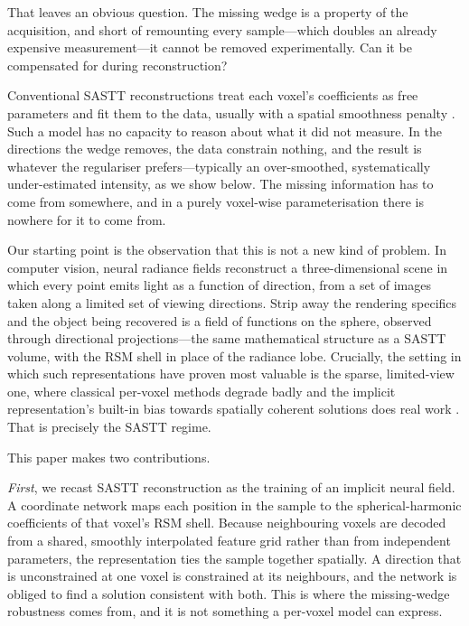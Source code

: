 \documentclass[11pt,a4paper]{article}
\begin{document}
That leaves an obvious question. The missing wedge is a property of the acquisition, and
short of remounting every sample---which doubles an already expensive measurement---it
cannot be removed experimentally. Can it be compensated for during reconstruction?

Conventional SASTT reconstructions treat each voxel's coefficients as free parameters and
fit them to the data, usually with a spatial smoothness penalty
\citep{Liebi2018,Nielsen2023}. Such a model has no capacity to reason about what it did not
measure. In the directions the wedge removes, the data constrain nothing, and the result is
whatever the regulariser prefers---typically an over-smoothed, systematically
under-estimated intensity, as we show below. The missing information has to come from
somewhere, and in a purely voxel-wise parameterisation there is nowhere for it to come
from.

Our starting point is the observation that this is not a new kind of problem. In computer
vision, neural radiance fields \citep{Mildenhall2020} reconstruct a three-dimensional
scene in which every point emits light as a function of direction, from a set of images
taken along a limited set of viewing directions. Strip away the rendering specifics and
the object being recovered is a field of functions on the sphere, observed through
directional projections---the same mathematical structure as a SASTT volume, with the RSM shell
in place of the radiance lobe. Crucially, the setting in which such representations have
proven most valuable is the sparse, limited-view one, where classical per-voxel methods
degrade badly and the implicit representation's built-in bias towards spatially coherent
solutions does real work \citep{Zha2022}. That is precisely the SASTT regime.

This paper makes two contributions.

\emph{First}, we recast SASTT reconstruction as the training of an implicit neural field.
A coordinate network maps each position in the sample to the spherical-harmonic
coefficients of that voxel's RSM shell. Because neighbouring voxels are decoded from a shared,
smoothly interpolated feature grid rather than from independent parameters, the
representation ties the sample together spatially. A direction that is unconstrained at
one voxel is constrained at its neighbours, and the network is obliged to find a solution
consistent with both. This is where the missing-wedge robustness comes from, and it is not
something a per-voxel model can express.
\end{document}
